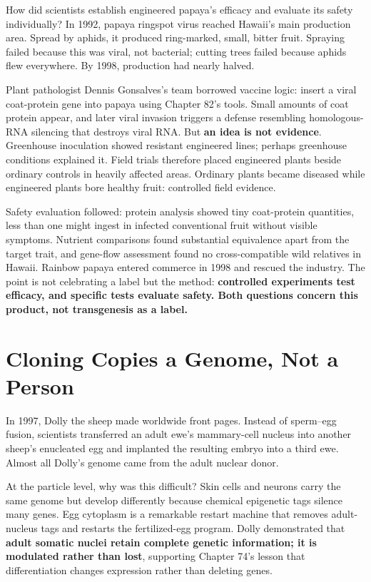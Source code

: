 \begin{zhengju}
How did scientists establish engineered papaya's efficacy and evaluate its safety individually? In 1992, papaya ringspot virus reached Hawaii's main production area. Spread by aphids, it produced ring-marked, small, bitter fruit. Spraying failed because this was viral, not bacterial; cutting trees failed because aphids flew everywhere. By 1998, production had nearly halved.

Plant pathologist Dennis Gonsalves's team borrowed vaccine logic: insert a viral coat-protein gene into papaya using Chapter 82's tools. Small amounts of coat protein appear, and later viral invasion triggers a defense resembling homologous-RNA silencing that destroys viral RNA. But \textbf{an idea is not evidence}. Greenhouse inoculation showed resistant engineered lines; perhaps greenhouse conditions explained it. Field trials therefore placed engineered plants beside ordinary controls in heavily affected areas. Ordinary plants became diseased while engineered plants bore healthy fruit: controlled field evidence.

Safety evaluation followed: protein analysis showed tiny coat-protein quantities, less than one might ingest in infected conventional fruit without visible symptoms. Nutrient comparisons found substantial equivalence apart from the target trait, and gene-flow assessment found no cross-compatible wild relatives in Hawaii. Rainbow papaya entered commerce in 1998 and rescued the industry. The point is not celebrating a label but the method: \textbf{controlled experiments test efficacy, and specific tests evaluate safety. Both questions concern this product, not transgenesis as a label.}
\end{zhengju}

\section{Cloning Copies a Genome, Not a Person}

In 1997, Dolly the sheep made worldwide front pages. Instead of sperm--egg fusion, scientists transferred an adult ewe's mammary-cell nucleus into another sheep's enucleated egg and implanted the resulting embryo into a third ewe. Almost all Dolly's genome came from the adult nuclear donor.

At the particle level, why was this difficult? Skin cells and neurons carry the same genome but develop differently because chemical epigenetic tags silence many genes. Egg cytoplasm is a remarkable restart machine that removes adult-nucleus tags and restarts the fertilized-egg program. Dolly demonstrated that \textbf{adult somatic nuclei retain complete genetic information; it is modulated rather than lost}, supporting Chapter 74's lesson that differentiation changes expression rather than deleting genes.


